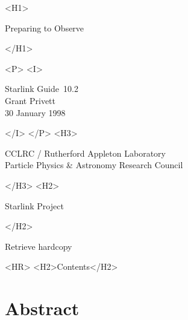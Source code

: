\documentclass[twoside,11pt]{article}
\newcommand{\stardoccategory}  {Starlink Guide}
\newcommand{\stardocsource}    {sg\stardocnumber}
\newcommand{\stardocnumber}    {10.2}
\newcommand{\stardocauthors}   {Grant Privett}
\newcommand{\stardocdate}      {30 January 1998}
\newcommand{\stardoctitle}     {Preparing to Observe}
\newcommand{\stardocversion}   {Software and WWW-Based Resources}
\newcommand{\stardocmanual}    { }
\newcommand{\htmladdnormallink}[2]{#1}
\newcommand{\htmladdimg}[1]{}
\newcommand{\htmlref}[2]{#1}
\newcommand{\htmladdtonavigation}[1]{}
\newcommand{\xlabel}[1]{}
\newcommand{\latexonlytoc}[0]{\tableofcontents}
\begin{document}
\begin{htmlonly}
   \xlabel{}
   \begin{rawhtml} <H1> \end{rawhtml}
      \stardoctitle
   \begin{rawhtml} </H1> \end{rawhtml}

   \vspace{10mm}
   \begin{figure}[h]
   \leavevmode
   \centering {}
   \end{figure}

   \begin{rawhtml} <P> <I> \end{rawhtml}
   \stardoccategory\ \stardocnumber \\
   \stardocauthors \\
   \stardocdate
   \begin{rawhtml} </I> </P> <H3> \end{rawhtml}
      \htmladdnormallink{CCLRC}{http://www.cclrc.ac.uk} /
      \htmladdnormallink{Rutherford Appleton Laboratory}
                        {http://www.cclrc.ac.uk/ral} \\
      \htmladdnormallink{Particle Physics \& Astronomy Research Council}
                        {http://www.pparc.ac.uk} \\
   \begin{rawhtml} </H3> <H2> \end{rawhtml}
      \htmladdnormallink{Starlink Project}{http://www.starlink.ac.uk/}
   \begin{rawhtml} </H2> \end{rawhtml}
   \htmladdnormallink{\htmladdimg{source.gif} Retrieve hardcopy}
      {http://www.starlink.ac.uk/cgi-bin/hcserver?\stardocsource}\\

  \label{stardoccontents}
  \begin{rawhtml}
    <HR>
    <H2>Contents</H2>
  \end{rawhtml}
  \newcommand{\latexonlytoc}[0]{}
  \htmladdtonavigation{\htmlref{\htmladdimg{contents_motif.gif}}
        {stardoccontents}}

  \section{\xlabel{abstract}Abstract}
\end{htmlonly}
\end{document}
